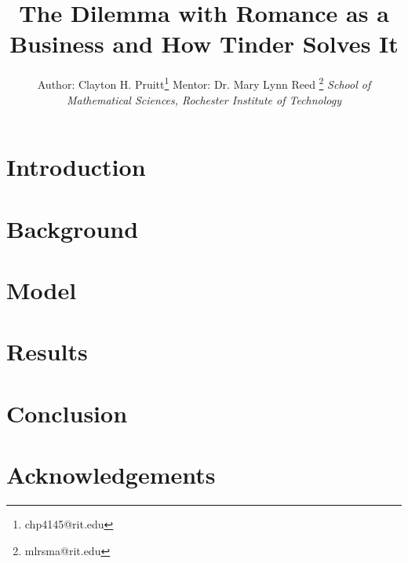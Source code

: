 \documentclass[12pt]{article}
\title{The Dilemma with Romance as a Business and How Tinder Solves It}
\author{Author: Clayton H. Pruitt\footnote{chp4145@rit.edu} \newline Mentor: Dr. Mary Lynn Reed \footnote{mlrsma@rit.edu} \newline \textit{School of Mathematical Sciences, Rochester Institute of Technology}}
\makeatletter
\renewcommand{\maketitle}{\bgroup\setlength{\parindent}{0pt}
\begin{flushleft}
 \textbf{\@title}

 \@author
\end{flushleft}\egroup
}
\makeatother
\begin{document}
\maketitle



\section{Introduction}


\section{Background}


\section{Model}


\section{Results}


\section{Conclusion}


\section{Acknowledgements}




\end{document}
